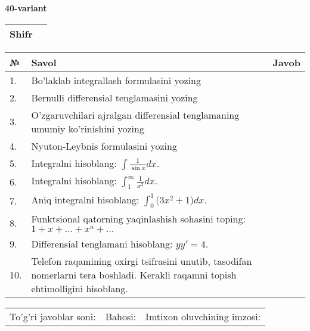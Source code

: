 \documentclass{article}
\begin{document}
  \egroup
  
  \newpage
  
  
  \textbf{40-variant}\\
  
  \bgroup
  \def\arraystretch{1.6} %
  
  \begin{tabular}{|m{5.7cm}|m{9.5cm}|}
  \hline
  Shifr & \\
  \hline
  \end{tabular}
  
  \vspace{1cm}
  
  \begin{tabular}{|m{0.7cm}|m{10cm}|m{4cm}|}
  \hline
  № & Savol & Javob \\
  \hline
  1. & Bo'laklab integrallash formulasini yozing &  \\
  \hline
  2. & Bernulli differensial tenglamasini yozing &  \\
  \hline
  3. & O'zgaruvchilari ajralgan differensial tenglamaning umumiy ko'rinishini yozing &  \\
  \hline
  4. & Nyuton-Leybnis formulasini yozing &  \\
  \hline
  5. & Integralni hisoblang: \(\int {\frac{1}{\sin x}dx}\). &  \\
  \hline
  6. & Integralni hisoblang: \(\int_{1}^{\infty}{\frac{1}{x^{2}}dx}\). &  \\
  \hline
  7. & Aniq integralni hisoblang: \(\int_{0}^{1}{(3x^{2}} + 1)dx\). &  \\
  \hline
  8. & Funktsional qatorning yaqinlashish sohasini toping:\(1 + x + ... + x^{n} + ...\) &  \\
  \hline
  9. & Differensial tenglamani hisoblang: \(yy' = 4\). &  \\
  \hline
  10. & Telefon raqamining oxirgi tsifrasini unutib, tasodifan nomerlarni tera boshladi. Kerakli raqamni topish ehtimolligini hisoblang. &  \\
  \hline
  \end{tabular}
  
  \vspace{1cm}
  
  \begin{tabular}{lll}
  To'g'ri javoblar soni: \underline{\hspace{1.5cm}} & 
  Bahosi: \underline{\hspace{1.5cm}} & 
  Imtixon oluvchining imzosi: \underline{\hspace{2cm}} \\
  \end{tabular}
  
\end{document}
